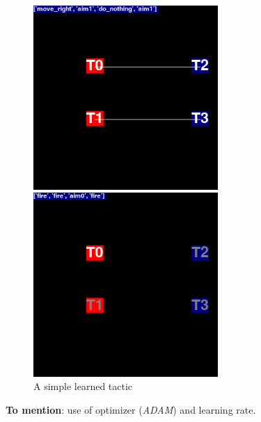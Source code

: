 \begin{figure}
\begin{minipage}{.5\textwidth}
  \includegraphics[width=7cm]{images/animation01/screenshot0-3.png}
\end{minipage}%
\begin{minipage}{.5\textwidth}
  \centering
  \includegraphics[width=7cm]{images/animation01/screenshot0-4.png}
\end{minipage}
\caption{A simple learned tactic}
\label{fig:simple_tactic01}
\end{figure}

\textbf{To mention}: use of optimizer (\emph{ADAM}) and learning rate.\\

